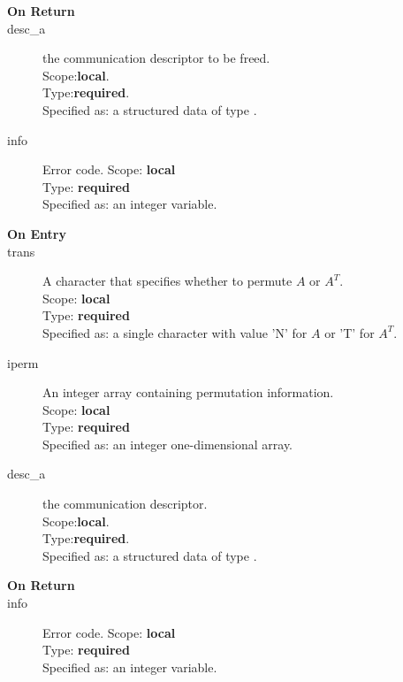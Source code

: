 \begin{description}
\item[\bf On Return]
\item[desc\_a] the communication descriptor to be freed.\\
Scope:{\bf local}.\\
Type:{\bf required}.\\
Specified as: a structured data of type \descdata.
\item[info] Error code.
Scope: {\bf local} \\
Type: {\bf required}\\
Specified as: an integer variable.
\end{description}



%
%


\begin{description}
\item[\bf On Entry]
\item[trans] A character that specifies whether to permute $A$  or $A^T$.\\
Scope: {\bf local} \\
Type: {\bf required}\\
Specified as: a single character with value 'N' for $A$ or 'T' for $A^T$.\\
\item[iperm] An integer array containing permutation information.\\
Scope: {\bf local} \\
Type: {\bf required}\\
Specified as: an integer one-dimensional array.\\
\item[desc\_a] the communication descriptor.\\
Scope:{\bf local}.\\
Type:{\bf required}.\\
Specified as: a structured data of type \descdata.
\end{description}

\begin{description}
\item[\bf On Return]
\item[info] Error code.
Scope: {\bf local} \\
Type: {\bf required}\\
Specified as: an integer variable.
\end{description}



